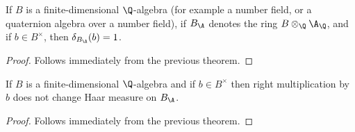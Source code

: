   \begin{corollary}
    \label{NumberField.AdeleRing.units_mem_ringHaarCharacter_ker}
    \leanok
    If $B$ is a finite-dimensional $\Q$-algebra (for example a number field, or a quaternion algebra over a number field),
    if $B_{\A}$ denotes the ring $B\otimes_{\Q}\A_{\Q}$, and if $b\in B^\times$,
    then $\delta_{B_{\A}}(b)=1$.
  \end{corollary}
  \begin{proof}
    Follows immediately from the previous theorem.
  \end{proof}

  \begin{corollary}
    \label{NumberField.AdeleRing.addEquivAddHaarChar_mulRight_unit_eq_one}
    \leanok
    If $B$ is a finite-dimensional $\Q$-algebra and
    if $b\in B^\times$ then right multiplication by $b$
    does not change Haar measure on $B_{\A}$.
  \end{corollary}
  \begin{proof}
    Follows immediately from the previous theorem.
  \end{proof}
